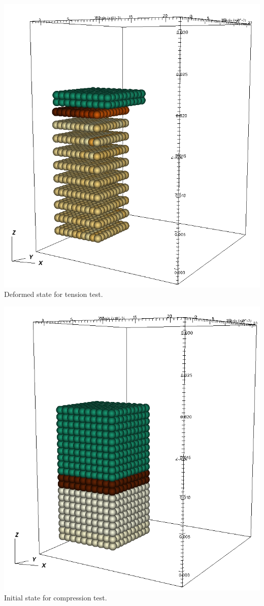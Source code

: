 \begin{minipage}[t]{0.25\textwidth}
  \centering
  \includegraphics[width=0.9\columnwidth]{FIGS/contact/rigid_tension_end.png}\\
  {Deformed state for tension test.}
\end{minipage}
\begin{minipage}[t]{0.25\textwidth}
  \centering
  \includegraphics[width=0.9\columnwidth]{FIGS/contact/rigid_compression.png}
  {Initial state for compression test.}
\end{minipage}
